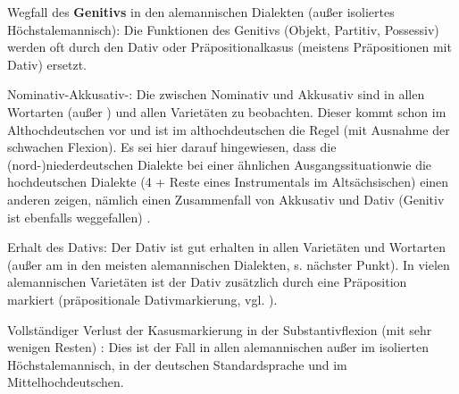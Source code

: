 \begin{longdescription}
\item[Wegfall des \textbf{Genitivs} in den alemannischen Dialekten (außer isoliertes Höchstalemannisch):] Die Funktionen des Genitivs (Objekt, Partitiv, Possessiv) werden oft durch den Dativ oder Präpositionalkasus (meistens Präpositionen mit Dativ) ersetzt.
\item[Nominativ-Akkusativ-\isi{Synkretismen}:] Die  zwischen Nominativ und Akkusativ sind in allen Wortarten (außer ) und allen Varietäten zu beobachten. Dieser  kommt schon im Althochdeutschen vor und ist im althochdeutschen  die Regel (mit Ausnahme der schwachen Flexion). Es sei hier darauf hingewiesen, dass die (nord-)niederdeutschen Dialekte bei einer ähnlichen Ausgangssituation\linebreak wie die hochdeutschen Dialekte (4  + Reste eines Instrumentals im Altsächsischen) einen anderen  zeigen, nämlich einen Zusammenfall von Akkusativ und Dativ (Genitiv ist ebenfalls weggefallen) \citep[66]{Berg2014}.
\item[Erhalt des Dativs:] Der Dativ ist gut erhalten in allen Varietäten und Wortarten (außer am  in den meisten alemannischen Dialekten, s. nächster Punkt). In vielen alemannischen Varietäten ist der Dativ zusätzlich durch eine Präposition markiert (präpositionale Dativmarkierung, vgl. \citet{Seiler2003}).
\item[Vollständiger Verlust der Kasusmarkierung in der Substantivflexion (mit sehr wenigen Resten)]: Dies ist der Fall in allen alemannischen  außer im isolierten Höchstalemannisch, in der deutschen Standardsprache und im Mittelhochdeutschen.

\end{longdescription}
